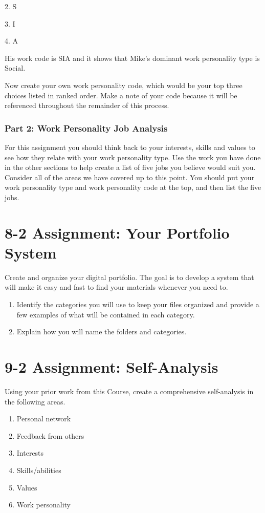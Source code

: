 2. S

3. I

4. A

His work code is SIA and it shows that Mike's dominant work personality type is Social.

Now create your own work personality code, which would be your top three choices listed in ranked order. Make a note of your code because it will be referenced throughout the remainder of this process.
\subsubsection*{Part 2: Work Personality Job Analysis}
For this assignment you should think back to your interests, skills and values to see how they relate with your work personality type. Use the work you have done in the other sections to help create a list of five jobs you believe would suit you. Consider all of the areas we have covered up to this point. You should put your work personality type and work personality code at the top, and then list the five jobs.

\clearpage \section*{8-2 Assignment: Your Portfolio System}
 
Create and organize your digital portfolio. The goal is to develop a system that will make it easy and fast to find your materials whenever you need to.
\begin{enumerate}[leftmargin=1cm]
	\item Identify the categories you will use to keep your files organized and provide a few examples of what will be contained in each category.
	\item Explain how you will name the folders and categories.
\end{enumerate}

\clearpage \section*{9-2 Assignment: Self-Analysis}
 
Using your prior work from this Course, create a comprehensive self-analysis in the following areas.
\begin{enumerate}[leftmargin=1cm]
	\item Personal network
	\item Feedback from others
	\item Interests
	\item Skills/abilities
	\item Values
	\item Work personality
\end{enumerate}